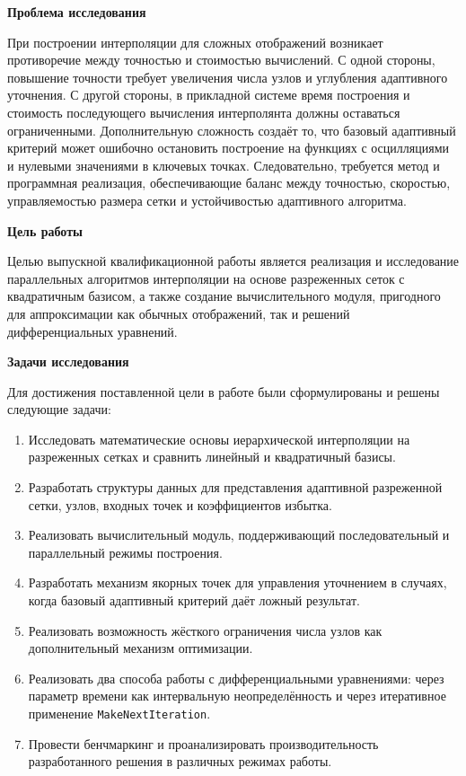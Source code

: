 \textbf{Проблема исследования}

При построении интерполяции для сложных отображений возникает противоречие между точностью и стоимостью вычислений. С одной стороны, повышение точности требует увеличения числа узлов и углубления адаптивного уточнения. С другой стороны, в прикладной системе время построения и стоимость последующего вычисления интерполянта должны оставаться ограниченными. Дополнительную сложность создаёт то, что базовый адаптивный критерий может ошибочно остановить построение на функциях с осцилляциями и нулевыми значениями в ключевых точках. Следовательно, требуется метод и программная реализация, обеспечивающие баланс между точностью, скоростью, управляемостью размера сетки и устойчивостью адаптивного алгоритма.

\textbf{Цель работы}

Целью выпускной квалификационной работы является реализация и исследование параллельных алгоритмов интерполяции на основе разреженных сеток с квадратичным базисом, а также создание вычислительного модуля, пригодного для аппроксимации как обычных отображений, так и решений дифференциальных уравнений.

\textbf{Задачи исследования}

Для достижения поставленной цели в работе были сформулированы и решены следующие задачи:

\begin{enumerate}
    \item Исследовать математические основы иерархической интерполяции на разреженных сетках и сравнить линейный и квадратичный базисы.
    \item Разработать структуры данных для представления адаптивной разреженной сетки, узлов, входных точек и коэффициентов избытка.
    \item Реализовать вычислительный модуль, поддерживающий последовательный и параллельный режимы построения.
    \item Разработать механизм якорных точек для управления уточнением в случаях, когда базовый адаптивный критерий даёт ложный результат.
    \item Реализовать возможность жёсткого ограничения числа узлов как дополнительный механизм оптимизации.
    \item Реализовать два способа работы с дифференциальными уравнениями: через параметр времени как интервальную неопределённость и через итеративное применение \texttt{MakeNextIteration}.
    \item Провести бенчмаркинг и проанализировать производительность разработанного решения в различных режимах работы.
\end{enumerate}

